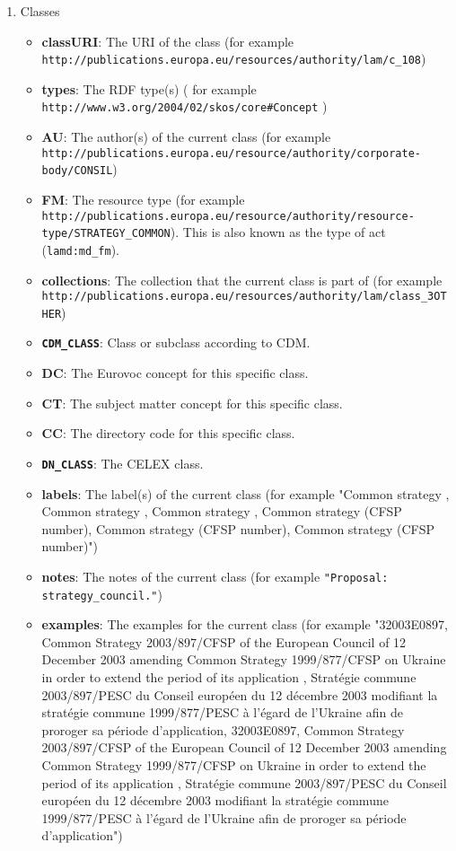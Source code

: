 \begin{enumerate}
\begin{itemize}
	\end{itemize}
	\item Classes
	\begin{itemize}
	\item \textbf{classURI}: The URI of the class (for example \lstinline!http://publications.europa.eu/resources/authority/lam/c_108!)
	\item \textbf{types}: The RDF type(s) ( for example \lstinline!http://www.w3.org/2004/02/skos/core#Concept! )
	\item \textbf{AU}: The author(s) of the current class (for example \lstinline!http://publications.europa.eu/resource/authority/corporate-body/CONSIL!)
	\item \textbf{FM}: The resource type (for example \lstinline!http://publications.europa.eu/resource/authority/resource-type/STRATEGY_COMMON!). This is also known as the type of act (\lstinline!lamd:md_fm!).
	\item \textbf{collections}: The collection that the current class is part of (for example \lstinline!http://publications.europa.eu/resources/authority/lam/class_3OTHER!)
	\item \textbf{\lstinline!CDM_CLASS!}: Class or subclass according to CDM.
	\item \textbf{DC}: The Eurovoc concept for this specific class.
	\item \textbf{CT}: The subject matter concept for this specific class.
	\item \textbf{CC}: The directory code for this specific class.
	\item \textbf{\lstinline!DN_CLASS!}: The CELEX class.
	\item \textbf{labels}: The label(s) of the current class (for example "Common strategy , Common strategy , Common strategy , Common strategy (CFSP number), Common strategy (CFSP number), Common strategy (CFSP number)")
	\item \textbf{notes}: The notes of the current class (for example \lstinline!"Proposal: strategy_council."!)
	\item \textbf{examples}: The examples for the current class (for example "32003E0897, Common Strategy 2003/897/CFSP of the European Council of 12 December 2003 amending Common Strategy 1999/877/CFSP on Ukraine in order to extend the period of its application , Stratégie commune 2003/897/PESC du Conseil européen du 12 décembre 2003 modifiant la stratégie commune 1999/877/PESC à l'égard de l'Ukraine afin de proroger sa période d'application, 32003E0897, Common Strategy 2003/897/CFSP of the European Council of 12 December 2003 amending Common Strategy 1999/877/CFSP on Ukraine in order to extend the period of its application , Stratégie commune 2003/897/PESC du Conseil européen du 12 décembre 2003 modifiant la stratégie commune 1999/877/PESC à l'égard de l'Ukraine afin de proroger sa période d'application")

\end{itemize}
\end{enumerate}
